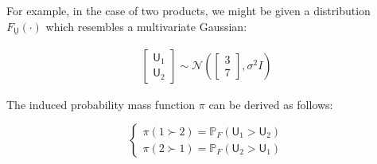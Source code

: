 \documentclass[11pt]{article}
\begin{document}
For example, in the case of two products, we might be given a distribution $F_{\underline{\textsf{U}}}(\cdot)$ which resembles a multivariate Gaussian: 


\begin{align*}
\begin{bmatrix}
\textsf{U}_{1} \\
\textsf{U}_{2}
\end{bmatrix}\sim \mathcal{N} \left (  
\begin{bmatrix}
3 \\
7
\end{bmatrix}
, \sigma^2 I\right )
\end{align*}

The induced probability mass function $\pi$ can be derived as follows:

\begin{equation*}
\begin{cases} 
\pi(1 \succ 2) = \mathbb{P}_F(\textsf{U}_1 > \textsf{U}_2) \\
\pi(2 \succ 1) = \mathbb{P}_F(\textsf{U}_2 > \textsf{U}_1)
\end{cases}
\end{equation*}
\end{document}
